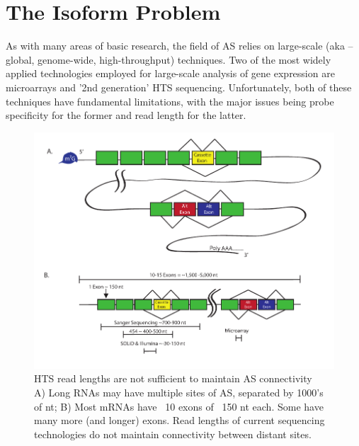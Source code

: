 \section{The Isoform Problem}

As with many areas of basic research, the field of AS relies on large-scale (aka – global, genome-wide, high-throughput) techniques. Two of the most widely applied technologies employed for large-scale analysis of gene expression are microarrays and '2nd generation' HTS sequencing. Unfortunately, both of these techniques have fundamental limitations, with the major issues being probe specificity for the former and read length for the latter.

\begin{figure}[htbp]
	\centering 
	\includegraphics{Figures/SeqLengths_and_Connectivity.pdf}
	\caption[HTS read lengths are not sufficient to maintain AS connectivity]
	{
		HTS read lengths are not sufficient to maintain AS connectivity\\[0.25cm]
		A) Long RNAs may have multiple sites of AS, separated by 1000's of nt; B) Most mRNAs have ~10 exons of ~150 nt each. Some have many more (and longer) exons. Read lengths of current sequencing technologies do not maintain connectivity between distant sites.
	}
	\label{fig:NoConnectivityInHTSMethods}
\end{figure}

